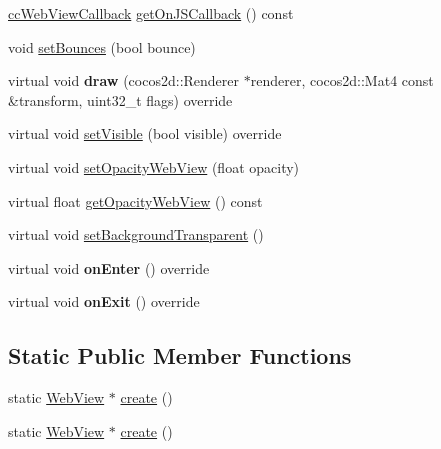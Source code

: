 \begin{DoxyCompactItemize}
\item 
\hyperlink{classexperimental_1_1ui_1_1WebView_a11ddd376a5996eff614857f236b2b69d}{cc\+Web\+View\+Callback} \hyperlink{classexperimental_1_1ui_1_1WebView_a33c0a59576feca0f08efcdfa88243147}{get\+On\+J\+S\+Callback} () const
\item 
void \hyperlink{classexperimental_1_1ui_1_1WebView_a0663d633aad187ab648d46521841979d}{set\+Bounces} (bool bounce)
\item 
\mbox{\label{classexperimental_1_1ui_1_1WebView_a60687b67b465a78655fde86fb7923905}} 
virtual void {\bfseries draw} (cocos2d\+::\+Renderer $\ast$renderer, cocos2d\+::\+Mat4 const \&transform, uint32\+\_\+t flags) override
\item 
virtual void \hyperlink{classexperimental_1_1ui_1_1WebView_a10dcce8d4ec09f0efb49dd845131af5a}{set\+Visible} (bool visible) override
\item 
virtual void \hyperlink{classexperimental_1_1ui_1_1WebView_affeb7e462605d9749c63500e640e2c7a}{set\+Opacity\+Web\+View} (float opacity)
\item 
virtual float \hyperlink{classexperimental_1_1ui_1_1WebView_a131ed65ceec3a88dfb9630abfbde7d84}{get\+Opacity\+Web\+View} () const
\item 
virtual void \hyperlink{classexperimental_1_1ui_1_1WebView_a83345ef293070d2ef77f93a6aa37ab01}{set\+Background\+Transparent} ()
\item 
\mbox{\label{classexperimental_1_1ui_1_1WebView_a6fc71724153b3295c0e105c7b838e1aa}} 
virtual void {\bfseries on\+Enter} () override
\item 
\mbox{\label{classexperimental_1_1ui_1_1WebView_adc4e3fea947a49f47372cda9bf607c1d}} 
virtual void {\bfseries on\+Exit} () override
\end{DoxyCompactItemize}
\subsection*{Static Public Member Functions}
\begin{DoxyCompactItemize}
\item 
static \hyperlink{classexperimental_1_1ui_1_1WebView}{Web\+View} $\ast$ \hyperlink{classexperimental_1_1ui_1_1WebView_aac00e7ed03953cdfc444c04aa33c61a8}{create} ()
\item 
static \hyperlink{classexperimental_1_1ui_1_1WebView}{Web\+View} $\ast$ \hyperlink{classexperimental_1_1ui_1_1WebView_aac00e7ed03953cdfc444c04aa33c61a8}{create} ()
\end{DoxyCompactItemize}
